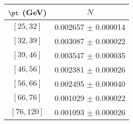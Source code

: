 \begin{tabular}{c||c}
$\pt$ (GeV) & $N$  \\
\hline
$[25, 32]$ & 0.002657 $\pm$ 0.000014\\
$[32, 39]$ & 0.003087 $\pm$ 0.000022\\
$[39, 46]$ & 0.003547 $\pm$ 0.000035\\
$[46, 56]$ & 0.002381 $\pm$ 0.000026\\
$[56, 66]$ & 0.002495 $\pm$ 0.000040\\
$[66, 76]$ & 0.001029 $\pm$ 0.000022\\
$[76, 120]$ & 0.001093 $\pm$ 0.000026\\
\end{tabular}
